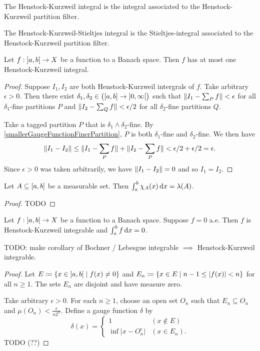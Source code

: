 \begin{definition}
The Henstock-Kurzweil integral is the integral associated to the Henstock-Kurzweil partition filter.

The Henstock-Kurzweil-Stieltjes integral is the Stieltjes-integral associated to the Henstock-Kurzweil partition filter.
\end{definition}

\begin{lemma}
Let $f: \interval[o]{a,b}\to X$ be a function to a Banach space. Then $f$ has at most one Henstock-Kurzweil integral.
\end{lemma}
\begin{proof}
Suppose $I_1,I_2$ are both Henstock-Kurzweil intergrals of $f$. Take arbitrary $\epsilon > 0$. Then there exist $\delta_1,\delta_2 \in \big(\interval{a,b}\to \interval[o]{0,\infty}\big)$ such that $\lVert I_1 - \sum_P f\rVert < \epsilon$ for all $\delta_1$-fine partitions $P$ and $\lVert I_2 - \sum_Q f\rVert < \epsilon/2$ for all $\delta_2$-fine partitions $Q$.

Take a tagged partition $P$ that is $\delta_1\wedge \delta_2$-fine. By \ref{smallerGaugeFunctionFinerPartition}, $P$ is both $\delta_1$-fine and $\delta_2$-fine. We then have
\[ \lVert I_1 - I_2\rVert \leq \lVert I_1 - \sum_P f\rVert + \lVert I_2 - \sum_P f\rVert < \epsilon /2 + \epsilon /2 = \epsilon. \]
Since $\epsilon > 0$ was taken arbitrarily, we have $\lVert I_1 - I_2\rVert = 0$ and so $I_1 = I_2$.
\end{proof}

\begin{lemma}
Let $A\subseteq \interval{a,b}$ be a measurable set. Then $\int_a^b \chi_{A}(x)\operatorname{d \!}{x} = \lambda(A)$.
\end{lemma}
\begin{proof}
TODO
\end{proof}

\begin{proposition}
Let $f: \interval[o]{a,b}\to X$ be a function to a Banach space. Suppose $f = 0$ a.e. Then $f$ is Henstock-Kurzweil integrable and $\int_a^b f\operatorname{d \!}{x} = 0$.
\end{proposition}
TODO: make corollary of Bochner / Lebesgue integrable $\implies$ Henstock-Kurzweil integrable.
\begin{proof}
Let $E \defeq \setbuilder{x\in \interval[o]{a,b}}{f(x) \neq 0}$ and $E_n \defeq \setbuilder{x\in E}{n-1 \leq |f(x)| < n}$ for all $n \geq 1$. The sets $E_n$ are disjoint and have measure zero.

Take arbitrary $\epsilon > 0$. For each $n\geq 1$, choose an open set $O_n$ such that $E_n \subseteq O_n$ and $\mu(O_n) < \frac{\epsilon}{n2^n}$. Define a gauge function $\delta$ by
\[ \delta(x) = \begin{cases}
1 & (x\notin E) \\ \inf\big|x - O_n^c\big| & (x\in E_n).
\end{cases} \]
TODO (??)
\end{proof}

